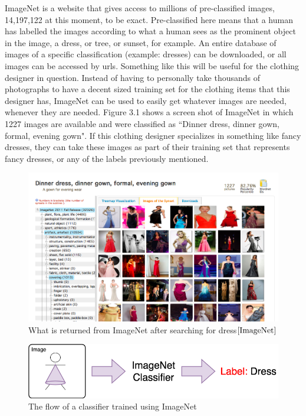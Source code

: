 \documentclass[12pt]{report} %
\begin{document}
	ImageNet \cite{ImageNet} is a website that gives access to millions of pre-classified images, 14,197,122 at this moment, to be exact. Pre-classified here means that a human has labelled the images according to what a human sees as the prominent object in the image, a dress, or tree, or sunset, for example. An entire database of images of a specific classification (example: dresses) can be downloaded, or all images can be accessed by urls. Something like this will be useful for the clothing designer in question. Instead of having to personally take thousands of photographs to have a decent sized training set for the clothing items that this designer has, ImageNet can be used to easily get whatever images are needed, whenever they are needed. Figure 3.1 shows a screen shot of ImageNet in which 1227 images are available and were classified as ``Dinner dress, dinner gown, formal, evening gown". If this clothing designer specializes in something like fancy dresses, they can take these images as part of their training set that represents fancy dresses, or any of the labels previously mentioned.
\begin{figure}
\centering
\includegraphics[width=7in]{Imagenet_dress}
\caption{What is returned from ImageNet after searching for dress$\cite{ImageNet}$}
\end{figure}	

\begin{figure}
\centering
\includegraphics[width=7in]{Imagenet_flow}
\caption{The flow of a classifier trained using ImageNet}
\end{figure}	
\end{document}
